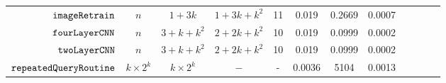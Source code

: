 {\begin {table}[H]
\begin{center}
{\begin{tabular}{| >{\tiny}r | c | c | c | c | c | c | c | c | c | c | c }
         {$\mathtt{imageRetrain}$} & $n$ &  $1 + 3k $ &  $1 + 3k  + k^2$  &  11 & 0.019 & 0.2669  & 0.0007 \\
         $ \mathtt{fourLayerCNN}$ & $n$ &  $3 + k + k^2  $ &  $2 + 2k + k^2  $  &  10 & 0.019 & 0.0999  & 0.0002 \\
         $ \mathtt{twoLayerCNN}$ & $n$ &  $3 + k + k^2  $ &  $2 + 2k + k^2  $  &  10 & 0.019 & 0.0999  & 0.0002 \\
         $  \mathtt{repeatedQueryRoutine}$ & $ k \times 2^k $ & $  k \times 2^k $ & $- $   &  - & 0.0036 & 5104  &  0.0013\\
         \hline \hline
        \end{tabular}
}
\end{center}
\end{table}
}


